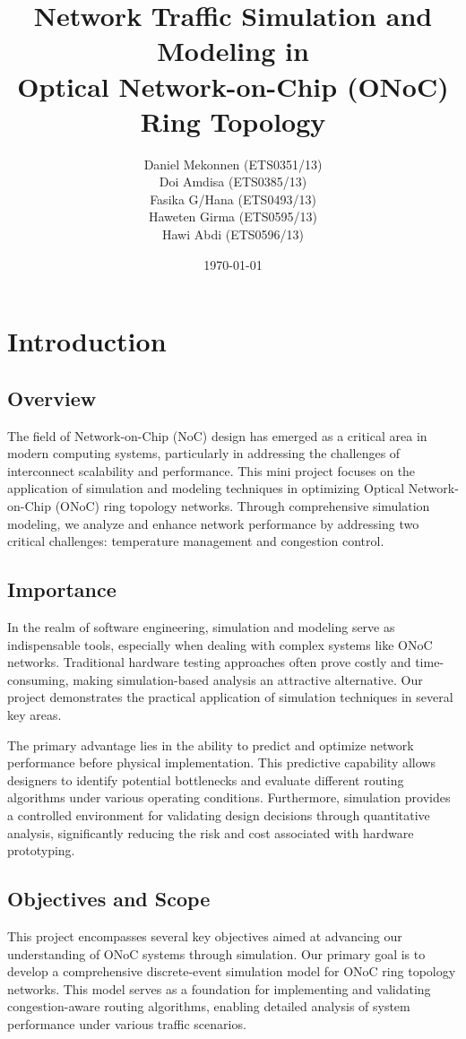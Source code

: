 \documentclass[12pt]{article}
\title{\Large Network Traffic Simulation and Modeling in \\ Optical Network-on-Chip (ONoC) Ring Topology}
\author{
    Daniel Mekonnen (ETS0351/13) \\
    Doi Amdisa (ETS0385/13) \\
    Fasika G/Hana (ETS0493/13) \\
    Haweten Girma (ETS0595/13) \\
    Hawi Abdi (ETS0596/13)
}
\date{\today}
\begin{document}
\maketitle
\thispagestyle{empty}  %

\newpage
\tableofcontents
\thispagestyle{empty}
\newpage

\setcounter{page}{1}  %

\section{Introduction}
\subsection{Overview}
The field of Network-on-Chip (NoC) design has emerged as a critical area in modern computing systems, particularly in addressing the challenges of interconnect scalability and performance. This mini project focuses on the application of simulation and modeling techniques in optimizing Optical Network-on-Chip (ONoC) ring topology networks. Through comprehensive simulation modeling, we analyze and enhance network performance by addressing two critical challenges: temperature management and congestion control.

\subsection{Importance}
In the realm of software engineering, simulation and modeling serve as indispensable tools, especially when dealing with complex systems like ONoC networks. Traditional hardware testing approaches often prove costly and time-consuming, making simulation-based analysis an attractive alternative. Our project demonstrates the practical application of simulation techniques in several key areas.

The primary advantage lies in the ability to predict and optimize network performance before physical implementation. This predictive capability allows designers to identify potential bottlenecks and evaluate different routing algorithms under various operating conditions. Furthermore, simulation provides a controlled environment for validating design decisions through quantitative analysis, significantly reducing the risk and cost associated with hardware prototyping.

\subsection{Objectives and Scope}
This project encompasses several key objectives aimed at advancing our understanding of ONoC systems through simulation. Our primary goal is to develop a comprehensive discrete-event simulation model for ONoC ring topology networks. This model serves as a foundation for implementing and validating congestion-aware routing algorithms, enabling detailed analysis of system performance under various traffic scenarios.
\end{document}
